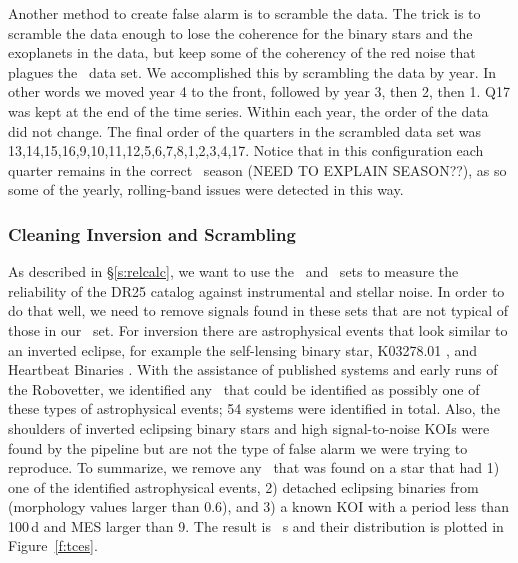 Another method to create false alarm is to scramble the data.  The trick is to scramble the data enough to lose the coherence for the binary stars and the exoplanets in the data, but keep some of the coherency of the red noise that plagues the \Kepler\ data set.  We accomplished this by scrambling the data by year. In other words we moved year 4 to the front, followed by year 3, then 2, then 1. Q17 was kept at the end of the time series. Within each year, the order of the data did not change. The final order of the quarters in the scrambled data set was 13,14,15,16,9,10,11,12,5,6,7,8,1,2,3,4,17.  Notice that in this configuration each quarter remains in the correct \Kepler\ season (NEED TO EXPLAIN SEASON??), as so some of the yearly, rolling-band issues were detected in this way.




\subsubsection{Cleaning Inversion and Scrambling}
\label{s:clean}
As described in \S\ref{s:relcalc}, we want to use the \invtce\ and \scrtce\ sets to measure the reliability of the DR25 catalog against instrumental and stellar noise.  In order to do that well, we need to remove signals found in these sets that are not typical of those in our \opstce\ set.  For inversion there are astrophysical events that look similar to an inverted eclipse, for example the self-lensing binary star, K03278.01 \citep{Kruse2014}, and Heartbeat Binaries \citep{Thompson2012}.  With the assistance of published systems and early runs of the Robovetter, we identified any \invtce\ that could be identified as possibly one of these types of astrophysical events; 54 systems were identified in total.  Also, the shoulders of inverted eclipsing binary stars and high signal-to-noise KOIs were found by the pipeline but are not the type of false alarm we were trying to reproduce.  To summarize, we remove any \invtce\ that was found on a star that had 1) one of the identified astrophysical events, 2) detached eclipsing binaries from \citet{Kirk2016} (morphology values larger than 0.6), and 3) a known KOI with a period less than 100\,d and MES larger than 9.  The result is \ninvtces\ \invtce s and their distribution is plotted in Figure~\ref{f:tces}.

